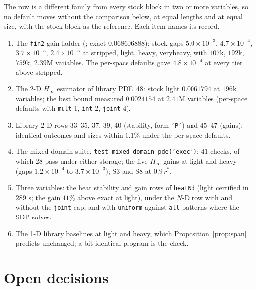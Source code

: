 \documentclass[12pt]{article}
\newcommand{\code}[1]{\texttt{#1}}
\newcommand{\file}[1]{\path{#1}}      %
\theoremstyle{plain}
\theoremstyle{definition}
\theoremstyle{remark}
\begin{document}
The row is a different family from every stock block in two or more variables, so no default moves without the comparison below, at equal lengths and at equal size, with the stock block as the reference. Each item names its record.
\begin{enumerate}\setlength\itemsep{0pt}
\item The \code{fin2} gain ladder (\file{settings_sopvar/README.md}; exact $0.068606888$): stock gaps $5.0\times10^{-3}$, $4.7\times10^{-4}$, $3.7\times10^{-5}$, $2.4\times10^{-5}$ at stripped, light, heavy, veryheavy, with $107$k, $192$k, $759$k, $2.39$M variables. The per-space defaults gave $4.8\times10^{-4}$ at every tier above stripped.
\item The 2-D $H_\infty$ estimator of library PDE~48: stock light $0.0061794$ at $196$k variables; the best bound measured $0.0024154$ at $2.41$M variables (per-space defaults with \code{mult} 1, \code{int} 2, \code{joint} 4).
\item Library 2-D rows 33--35, 37, 39, 40 (stability, form \code{'P'}) and 45--47 (gains): identical outcomes and sizes within $0.1\%$ under the per-space defaults.
\item The mixed-domain suite, \code{test\_mixed\_domain\_pde('exec')}: $41$ checks, of which $28$ pass under either storage; the five $H_\infty$ gains at light and heavy (gaps $1.2\times10^{-4}$ to $3.7\times10^{-3}$); S3 and S8 at $0.9\,r^*$.
\item Three variables: the heat stability and gain rows of \code{heatNd} (light certified in $289$ s; the gain $41\%$ above exact at light), under the $N$-D row with and without the \code{joint} cap, and with \code{uniform} against \code{all} patterns where the SDP solves.
\item The 1-D library baselines at light and heavy, which Proposition~\ref{prop:span} predicts unchanged; a bit-identical program is the check.
\end{enumerate}

\section{Open decisions}\label{sec:open}
\end{document}
